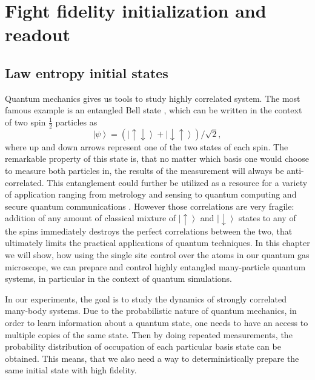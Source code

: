 \chapter{Fight fidelity initialization and readout}

\section{Law entropy initial states}
Quantum mechanics gives us tools to study highly correlated system. The most famous example is an entangled Bell state \cite{something}, which can be written in the context of two spin $\frac{1}{2}$ particles as 
\begin{equation}
\left| \psi \right>=(\left| \uparrow \downarrow \right>+ \left| \downarrow \uparrow \right>)/\sqrt{2},
\end{equation}
where up and down arrows represent one of the two states of each spin. The remarkable property of this state is, that no matter which basis one would choose to measure both particles in, the results of the measurement will always be anti-correlated. This entanglement could further be utilized as a resource for a variety of application ranging from metrology and sensing \cite{sombody} to quantum computing \cite{Chuang book} and secure quantum communications \cite{something}. However those correlations are very fragile: addition of any amount of classical mixture of $\left| \uparrow \right>$ and $\left| \downarrow \right>$ states to any of the spins immediately destroys the perfect correlations between the two, that ultimately limits the practical applications of quantum techniques. In this chapter we will show, how using the single site control over the atoms in our quantum gas microscope, we can prepare and control highly entangled many-particle quantum systems, in particular in the context of quantum simulations. 

In our experiments, the goal is to study the dynamics of strongly correlated many-body systems. Due to the probabilistic nature of quantum mechanics, in order to learn information about a quantum state, one needs to have an access to multiple copies of the same state. Then by doing repeated measurements, the probability distribution of occupation of each particular basis state can be obtained. This means, that we also need a way to deterministically prepare the same initial state with high fidelity. 

